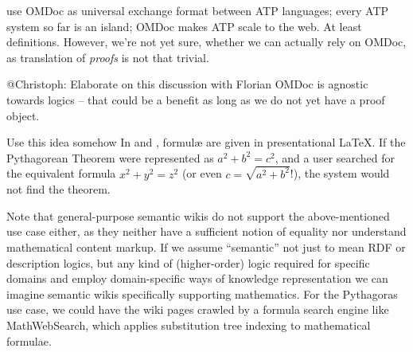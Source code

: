 use OMDoc as universal exchange format between ATP languages; every ATP system so far is
an island; OMDoc makes ATP scale to the web.  At least definitions.  However, we're not
yet sure, whether we can actually rely on OMDoc, as translation
of \emph{proofs} is not that trivial.



\begin{todo}{@Christoph: Elaborate on this discussion with Florian}
  OMDoc is agnostic towards logics -- that could be a benefit as long as we do
  not yet have a proof object.
\end{todo}


\begin{oldpart}{Use this idea somehow}
  In  and , formulæ are given in
  presentational {\LaTeX}.  If the Pythagorean Theorem were represented as $a^2
  + b^2 = c^2$, and a user searched for the equivalent formula $x^2 + y^2 = z^2$
  (or even $c=\sqrt{a^2+b^2}$!), the system would not find the theorem.

  Note that general-purpose semantic wikis do not support the above-mentioned
  use case either, as they neither have a sufficient notion of equality nor
  understand mathematical content markup.  If we assume ``semantic'' not just to
  mean RDF or description logics, but any kind of (higher-order) logic required
  for specific domains and employ domain-specific ways of
  knowledge representation we can imagine semantic wikis specifically supporting
  mathematics.  For the Pythagoras use case, we could have the wiki pages
  crawled by a formula search engine like MathWebSearch\cite{KohSuc:asemf06},
  which applies substitution tree indexing to mathematical formulae.
\end{oldpart}


